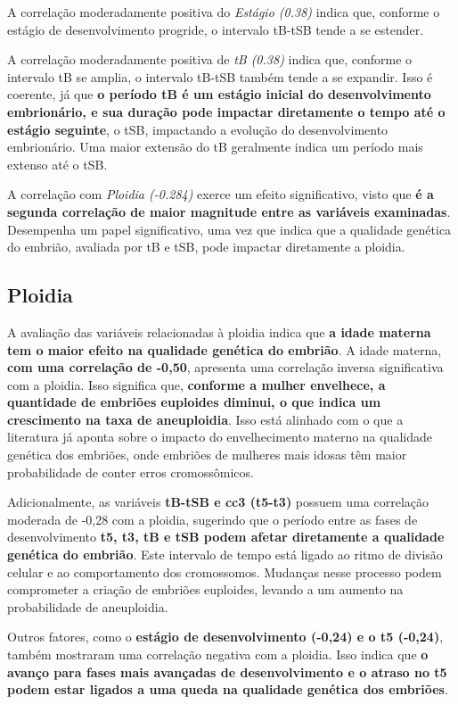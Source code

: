 A correlação moderadamente positiva do \textit{Estágio (0.38)} indica que, conforme o estágio de desenvolvimento progride, o intervalo tB-tSB tende a se estender. 

A correlação moderadamente positiva de \textit{tB (0.38)} indica que, conforme o intervalo tB se amplia, o intervalo tB-tSB também tende a se expandir. Isso é coerente, já que \textbf{o período tB é um estágio inicial do desenvolvimento embrionário, e sua duração pode impactar diretamente o tempo até o estágio seguinte}, o tSB, impactando a evolução do desenvolvimento embrionário. Uma maior extensão do tB geralmente indica um período mais extenso até o tSB.

A correlação com \textit{Ploidia (-0.284)} exerce um efeito significativo, visto que \textbf{é a segunda correlação de maior magnitude entre as variáveis examinadas}. Desempenha um papel significativo, uma vez que indica que a qualidade genética do embrião, avaliada por tB e tSB, pode impactar diretamente a ploidia. 

\subsection*{Ploidia}
A avaliação das variáveis relacionadas à ploidia indica que \textbf{a idade materna tem o maior efeito na qualidade genética do embrião}. A idade materna, \textbf{com uma correlação de -0,50}, apresenta uma correlação inversa significativa com a ploidia. Isso significa que, \textbf{conforme a mulher envelhece, a quantidade de embriões euploides diminui, o que indica um crescimento na taxa de aneuploidia}. Isso está alinhado com o que a literatura já aponta sobre o impacto do envelhecimento materno na qualidade genética dos embriões, onde embriões de mulheres mais idosas têm maior probabilidade de conter erros cromossômicos. 

Adicionalmente, as variáveis \textbf{tB-tSB e cc3 (t5-t3)} possuem uma correlação moderada de -0,28 com a ploidia, sugerindo que o período entre as fases de desenvolvimento \textbf{t5, t3, tB e tSB podem afetar diretamente a qualidade genética do embrião}. Este intervalo de tempo está ligado ao ritmo de divisão celular e ao comportamento dos cromossomos. Mudanças nesse processo podem comprometer a criação de embriões euploides, levando a um aumento na probabilidade de aneuploidia. 

Outros fatores, como o \textbf{estágio de desenvolvimento (-0,24) e o t5 (-0,24)}, também mostraram uma correlação negativa com a ploidia. Isso indica que \textbf{o avanço para fases mais avançadas de desenvolvimento e o atraso no t5 podem estar ligados a uma queda na qualidade genética dos embriões}. 

